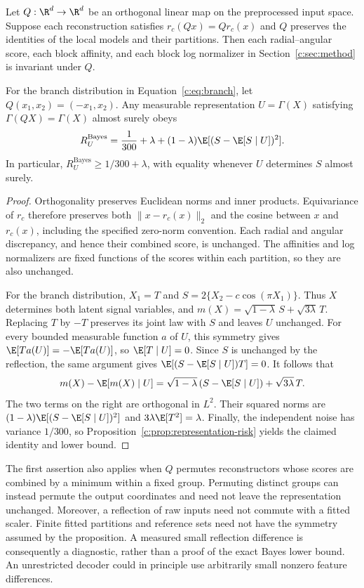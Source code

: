 \begin{proposition}
\label{c:prop:exact-symmetry}
Let $Q:\R^d\to\R^d$ be an orthogonal linear map on the preprocessed
input space. Suppose each reconstruction satisfies
$r_c(Qx)=Qr_c(x)$ and $Q$ preserves the identities of the local models
and their partitions. Then each radial--angular score, each block
affinity, and each block log normalizer in Section~\ref{c:sec:method}
is invariant under $Q$.

For the branch distribution in Equation~\eqref{c:eq:branch}, let
$Q(x_1,x_2)=(-x_1,x_2)$. Any measurable representation $U=\Gamma(X)$
satisfying $\Gamma(QX)=\Gamma(X)$ almost surely obeys
\[
 R_U^{\mathrm{Bayes}}
 =\frac{1}{300}+\lambda
 +(1-\lambda)\E[(S-\E[S\mid U])^2].
\]
In particular, $R_U^{\mathrm{Bayes}}\geq1/300+\lambda$, with equality
whenever $U$ determines $S$ almost surely.
\end{proposition}
\begin{proof}
Orthogonality preserves Euclidean norms and inner products. Equivariance
of $r_c$ therefore preserves both
$\|x-r_c(x)\|_2$ and the cosine between $x$ and $r_c(x)$, including the
specified zero-norm convention. Each radial and angular discrepancy,
and hence their combined score, is unchanged. The affinities and log
normalizers are fixed functions of the scores within each partition,
so they are also unchanged.

For the branch distribution, $X_1=T$ and
$S=2\{X_2-c\cos(\pi X_1)\}$. Thus $X$ determines both latent signal
variables, and
$m(X)=\sqrt{1-\lambda}\,S+\sqrt{3\lambda}\,T$. Replacing $T$ by $-T$
preserves its joint law with $S$ and leaves $U$ unchanged. For every
bounded measurable function $a$ of $U$, this symmetry gives
$\E[T a(U)]=-\E[T a(U)]$, so $\E[T\mid U]=0$. Since $S$ is unchanged
by the reflection, the same argument gives
$\E[(S-\E[S\mid U])T]=0$. It follows that
\[
 m(X)-\E[m(X)\mid U]
 =\sqrt{1-\lambda}\,(S-\E[S\mid U])+\sqrt{3\lambda}\,T.
\]
The two terms on the right are orthogonal in $L^2$. Their squared
norms are $(1-\lambda)\E[(S-\E[S\mid U])^2]$ and
$3\lambda\E[T^2]=\lambda$. Finally, the independent noise has variance
$1/300$, so Proposition~\ref{c:prop:representation-risk} yields the
claimed identity and lower bound.
\end{proof}

The first assertion also applies when $Q$ permutes reconstructors whose
scores are combined by a minimum within a fixed group. Permuting distinct
groups can instead permute the output coordinates and need not leave the
representation unchanged. Moreover, a reflection of raw inputs need not
commute with a fitted scaler. Finite fitted partitions and reference sets
need not have the symmetry assumed by the proposition. A measured small
reflection difference is consequently a diagnostic, rather than a proof
of the exact Bayes lower bound. An unrestricted decoder could in principle
use arbitrarily small nonzero feature differences.

